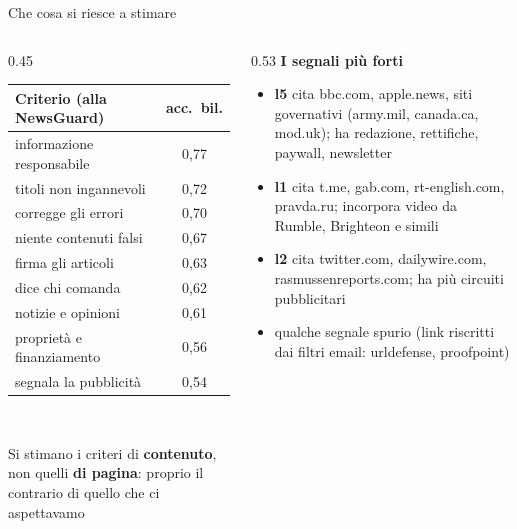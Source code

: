 \documentclass[aspectratio=169]{beamer}
\newcommand{\hl}[1]{\textbf{#1}}
\begin{document}
\begin{frame}{Che cosa si riesce a stimare}
  \begin{columns}[T]
    \begin{column}{0.45\textwidth}
      \centering\footnotesize
      \begin{tabular}{lc}
        \toprule
        \textbf{Criterio (alla NewsGuard)} & \textbf{acc.\ bil.} \\
        \midrule
        informazione responsabile & 0,77 \\
        titoli non ingannevoli & 0,72 \\
        corregge gli errori & 0,70 \\
        niente contenuti falsi & 0,67 \\
        firma gli articoli & 0,63 \\
        dice chi comanda & 0,62 \\
        notizie e opinioni & 0,61 \\
        propriet\`a e finanziamento & 0,56 \\
        segnala la pubblicit\`a & 0,54 \\
        \bottomrule
      \end{tabular}\\[0.4em]
      \raggedright\scriptsize Si stimano i criteri di \hl{contenuto}, non quelli \hl{di pagina}: proprio il contrario di quello che ci aspettavamo
    \end{column}
    \begin{column}{0.53\textwidth}
      \footnotesize
      \textbf{I segnali pi\`u forti}
      \begin{itemize}
        \setlength\itemsep{0.3em}
        \item \hl{l5} cita bbc.com, apple.news, siti governativi (army.mil, canada.ca, mod.uk); ha redazione, rettifiche, paywall, newsletter
        \item \hl{l1} cita t.me, gab.com, rt-english.com, pravda.ru; incorpora video da Rumble, Brighteon e simili
        \item \hl{l2} cita twitter.com, dailywire.com, rasmussenreports.com; ha pi\`u circuiti pubblicitari
        \item qualche segnale spurio (link riscritti dai filtri email: urldefense, proofpoint)
      \end{itemize}
    \end{column}
  \end{columns}
\end{frame}
\end{document}
